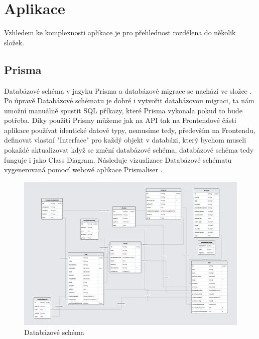 \chapter{Aplikace}
Vzhledem ke komplexnosti aplikace je pro přehlednost rozdělena do několik složek.
\section{Prisma}

Databázové schéma v jazyku Prisma a databázové migrace se nachází ve složce . Po úpravě Databázové schématu je dobré i vytvořit databázovou migraci, ta nám umožní manuálně spustit SQL příkazy, které Prisma vykonala pokud to bude potřeba. Díky použití Prismy můžeme jak na API tak na Frontendové části aplikace používat identické datové typy, nemusíme tedy, především na Frontendu, definovat vlastní "Interface" pro každý objekt v databázi, který bychom museli pokaždé aktualizovat když se změní databázové schéma, databázové schéma tedy funguje i jako Class Diagram.
Následuje vizualizace Databázové schématu vygenerovaná pomocí webové aplikace Prismaliser \cite{prismaliser}.
\begin{figure}[hbt!]
	\includegraphics[width=1\linewidth]{img/DB_schema.png}
	\caption{Databázové schéma}
\end{figure}
